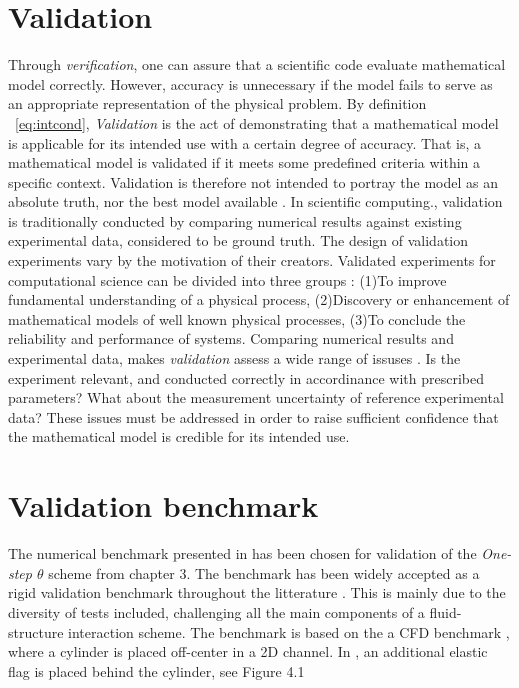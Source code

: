 \section{Validation}
Through \textit{verification}, one can assure that a scientific code evaluate mathematical model correctly. However, accuracy is unnecessary if the model fails to serve as an appropriate representation of the physical problem. By definition ~\ref{eq:intcond}, \textit{Validation} is the act of demonstrating that a mathematical model is applicable for its intended use with a certain degree of accuracy. That is, a mathematical model is validated if it meets some predefined criteria within a specific context. Validation is therefore not intended to portray the model as an absolute truth, nor the best model available \cite{Rykiel1996}. In scientific computing., validation is traditionally conducted by comparing numerical results against existing experimental data, considered to be ground truth. The design of validation experiments vary by the motivation of their creators. Validated experiments for computational science can be divided into three groups \cite{Sommerville2006}: (1)To improve fundamental understanding of a physical process, (2)Discovery or enhancement of mathematical models of well known physical processes, (3)To conclude the reliability and performance of systems. Comparing numerical results and experimental data, makes \textit{validation} assess a wide range of issuses \cite{Sommerville2006}. Is the experiment relevant, and  conducted correctly in accordinance with prescribed parameters? What about the measurement uncertainty of reference experimental data? These issues  must be addressed in order to raise sufficient confidence that the mathematical model is credible for its intended use. \\


 \newpage
 
\section{Validation benchmark}
The numerical benchmark presented in \cite{Hron2006} has been chosen for validation of the \textit{One-step $\theta$} scheme from chapter 3. The benchmark has been widely accepted as a rigid validation benchmark  throughout the litterature \cite{Wickb, Wick, V2013, Gatzhammer2014}. This is mainly due to the diversity of tests included, challenging all the main components of a fluid-structure interaction scheme. The benchmark is based on the a CFD benchmark \cite{White}, where a cylinder is placed off-center in a 2D channel. In \cite{Hron2006}, an additional elastic flag is placed behind the cylinder, see Figure 4.1

